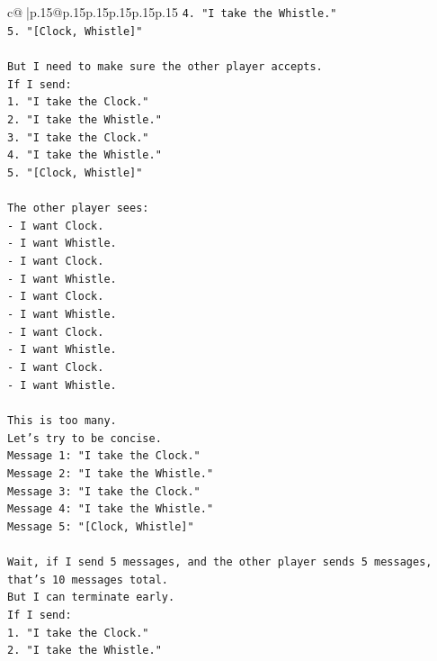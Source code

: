 \documentclass{article}
\begin{document}
{\begin{supertabular}{c@{$\;$}|p{.15\linewidth}@{}p{.15\linewidth}p{.15\linewidth}p{.15\linewidth}p{.15\linewidth}p{.15\linewidth}}
{{{\texttt{4. "I take the Whistle."} \\
\texttt{5. "{[}Clock, Whistle{]}"} \\
\\ 
\texttt{But I need to make sure the other player accepts.} \\
\texttt{If I send:} \\
\texttt{1. "I take the Clock."} \\
\texttt{2. "I take the Whistle."} \\
\texttt{3. "I take the Clock."} \\
\texttt{4. "I take the Whistle."} \\
\texttt{5. "{[}Clock, Whistle{]}"} \\
\\ 
\texttt{The other player sees:} \\
\texttt{{-} I want Clock.} \\
\texttt{{-} I want Whistle.} \\
\texttt{{-} I want Clock.} \\
\texttt{{-} I want Whistle.} \\
\texttt{{-} I want Clock.} \\
\texttt{{-} I want Whistle.} \\
\texttt{{-} I want Clock.} \\
\texttt{{-} I want Whistle.} \\
\texttt{{-} I want Clock.} \\
\texttt{{-} I want Whistle.} \\
\\ 
\texttt{This is too many.} \\
\texttt{Let's try to be concise.} \\
\texttt{Message 1: "I take the Clock."} \\
\texttt{Message 2: "I take the Whistle."} \\
\texttt{Message 3: "I take the Clock."} \\
\texttt{Message 4: "I take the Whistle."} \\
\texttt{Message 5: "{[}Clock, Whistle{]}"} \\
\\ 
\texttt{Wait, if I send 5 messages, and the other player sends 5 messages, that's 10 messages total.} \\
\texttt{But I can terminate early.} \\
\texttt{If I send:} \\
\texttt{1. "I take the Clock."} \\
\texttt{2. "I take the Whistle."} \\
}}}
\end{supertabular}}
\end{document}
